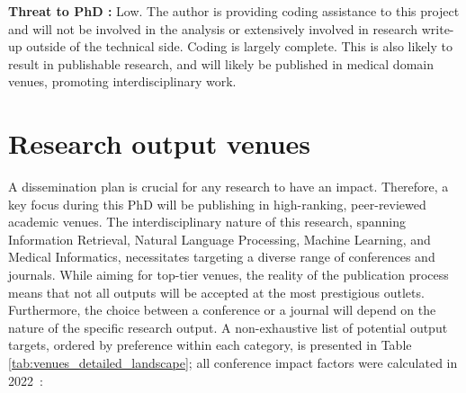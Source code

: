 \documentclass[10pt,oneside]{book}
\begin{document}
\textbf{Threat to PhD :} Low. The author is providing coding assistance to this project and will not be involved in the analysis or extensively involved in research write-up outside of the technical side. Coding is largely complete. This is also likely to result in publishable research, and will likely be published in medical domain venues, promoting interdisciplinary work.


\section{Research output venues}

A dissemination plan is crucial for any research to have an impact. Therefore, a key focus during this PhD will be publishing in high-ranking, peer-reviewed academic venues. The interdisciplinary nature of this research, spanning Information Retrieval, Natural Language Processing, Machine Learning, and Medical Informatics, necessitates targeting a diverse range of conferences and journals. While aiming for top-tier venues, the reality of the publication process means that not all outputs will be accepted at the most prestigious outlets. Furthermore, the choice between a conference or a journal will depend on the nature of the specific research output. A non-exhaustive list of potential output targets, ordered by preference within each category, is presented in Table \ref{tab:venues_detailed_landscape}; all conference impact factors were calculated in 2022~\cite{eickhoff_impact_2023}:
\end{document}
